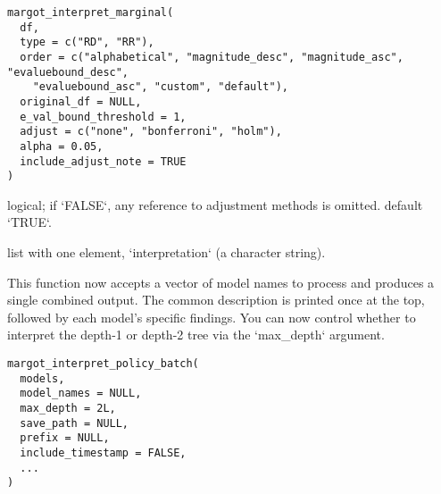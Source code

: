 \documentclass[a4paper]{book}
\begin{document}
%
\begin{Usage}
\begin{verbatim}
margot_interpret_marginal(
  df,
  type = c("RD", "RR"),
  order = c("alphabetical", "magnitude_desc", "magnitude_asc", "evaluebound_desc",
    "evaluebound_asc", "custom", "default"),
  original_df = NULL,
  e_val_bound_threshold = 1,
  adjust = c("none", "bonferroni", "holm"),
  alpha = 0.05,
  include_adjust_note = TRUE
)
\end{verbatim}
\end{Usage}
%
\begin{Arguments}
\begin{ldescription}
\item[\code{include\_adjust\_note}] logical; if `FALSE`, any reference to adjustment
methods is omitted. default `TRUE`.
\end{ldescription}
\end{Arguments}
%
\begin{Value}
list with one element, `interpretation` (a character string).
\end{Value}
%
\begin{Description}
This function now accepts a vector of model names to process and produces
a single combined output. The common description is printed once at the top,
followed by each model's specific findings. You can now control whether to
interpret the depth-1 or depth-2 tree via the `max\_depth` argument.
\end{Description}
%
\begin{Usage}
\begin{verbatim}
margot_interpret_policy_batch(
  models,
  model_names = NULL,
  max_depth = 2L,
  save_path = NULL,
  prefix = NULL,
  include_timestamp = FALSE,
  ...
)
\end{verbatim}
\end{Usage}
%
\end{document}
